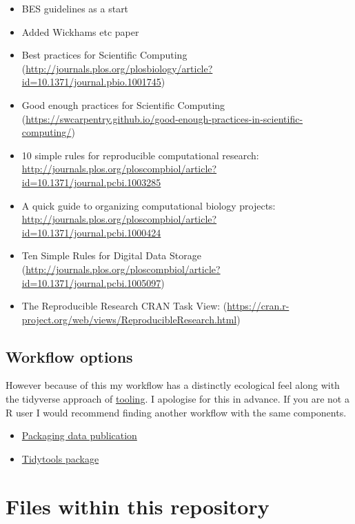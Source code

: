\documentclass[
]{book}
\theoremstyle{definition}
\theoremstyle{definition}
\theoremstyle{definition}
\theoremstyle{definition}
\theoremstyle{remark}
\begin{document}
\begin{itemize}
\item
  BES guidelines as a start
\item
  Added Wickhams etc paper
\item
  Best practices for Scientific Computing (\url{http://journals.plos.org/plosbiology/article?id=10.1371/journal.pbio.1001745})
\item
  Good enough practices for Scientific Computing (\url{https://swcarpentry.github.io/good-enough-practices-in-scientific-computing/})
\item
  10 simple rules for reproducible computational research: \url{http://journals.plos.org/ploscompbiol/article?id=10.1371/journal.pcbi.1003285}
\item
  A quick guide to organizing computational biology projects: \url{http://journals.plos.org/ploscompbiol/article?id=10.1371/journal.pcbi.1000424}
\item
  Ten Simple Rules for Digital Data Storage (\url{http://journals.plos.org/ploscompbiol/article?id=10.1371/journal.pcbi.1005097})
\item
  The Reproducible Research CRAN Task View: (\url{https://cran.r-project.org/web/views/ReproducibleResearch.html})
\end{itemize}

\hypertarget{workflow-options}{%
\section{Workflow options}\label{workflow-options}}

However because of this my workflow has a distinctly ecological feel along with the tidyverse approach of \href{https://style.tidyverse.org/index.html}{tooling}. I apologise for this in advance. If you are not a R user I would recommend finding another workflow with the same components.

\begin{itemize}
\item
  \href{https://peerj.com/preprints/3192/}{Packaging data publication}
\item
  \href{}{Tidytools package}
\end{itemize}

\hypertarget{files-within-this-repository}{%
\chapter{Files within this repository}\label{files-within-this-repository}}
\end{document}
